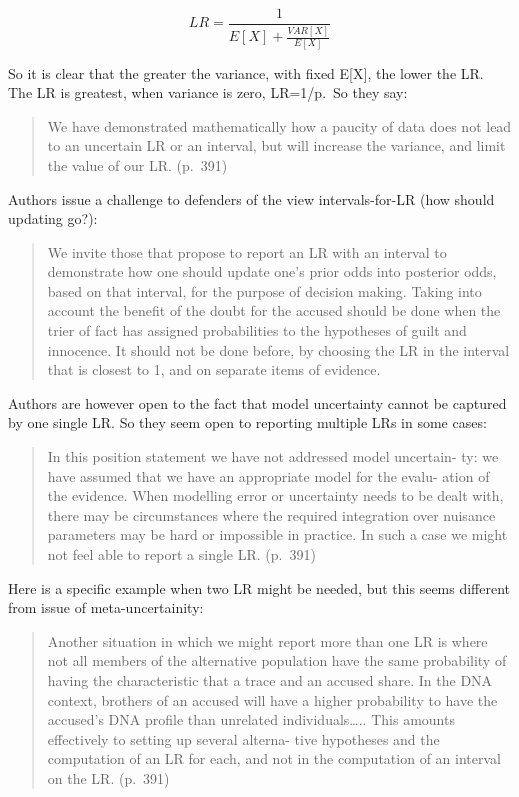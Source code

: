 \documentclass[
  10pt,
  dvipsnames,enabledeprecatedfontcommands]{scrartcl}
\begin{document}
\[LR = \frac{1}{E[X]+\frac{VAR[X]}{E[X]}}\]

\noindent So it is clear that the greater the variance, with fixed
E{[}X{]}, the lower the LR. The LR is greatest, when variance is zero,
LR=1/p.~So they say:

\begin{quote}
We have demonstrated mathematically how a paucity of data does not lead
to an uncertain LR or an interval, but will increase the variance, and
limit the value of our LR. (p.~391)
\end{quote}

\noindent Authors issue a challenge to defenders of the view
intervals-for-LR (how should updating go?):

\begin{quote}
We invite those that propose to report an LR with an interval to
demonstrate how one should update one's prior odds into posterior odds,
based on that interval, for the purpose of decision making. Taking into
account the benefit of the doubt for the accused should be done when the
trier of fact has assigned probabilities to the hypotheses of guilt and
innocence. It should not be done before, by choosing the LR in the
interval that is closest to 1, and on separate items of evidence.
\end{quote}

\noindent Authors are however open to the fact that model uncertainty
cannot be captured by one single LR. So they seem open to reporting
multiple LRs in some cases:

\begin{quote}
In this position statement we have not addressed model uncertain- ty: we
have assumed that we have an appropriate model for the evalu- ation of
the evidence. When modelling error or uncertainty needs to be dealt
with, there may be circumstances where the required integration over
nuisance parameters may be hard or impossible in practice. In such a
case we might not feel able to report a single LR. (p.~391)
\end{quote}

Here is a specific example when two LR might be needed, but this seems
different from issue of meta-uncertainity:

\begin{quote}
Another situation in which we might report more than one LR is where not
all members of the alternative population have the same probability of
having the characteristic that a trace and an accused share. In the DNA
context, brothers of an accused will have a higher probability to have
the accused's DNA profile than unrelated individuals\ldots.. This
amounts effectively to setting up several alterna- tive hypotheses and
the computation of an LR for each, and not in the computation of an
interval on the LR. (p.~391)
\end{quote}
\end{document}
